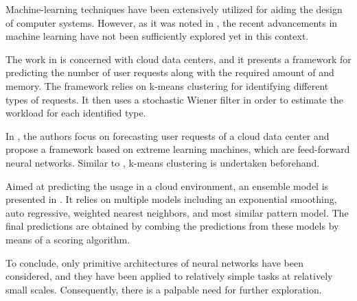 Machine-learning techniques have been extensively utilized for aiding the design
of computer systems. However, as it was noted in , the recent
advancements in machine learning have not been sufficiently explored yet in this
context.

The work in \cite{dabbagh2015} is concerned with cloud data centers, and it
presents a framework for predicting the number of user requests along with the
required amount of  and memory. The framework relies on k-means
clustering for identifying different types of requests. It then uses a
stochastic Wiener filter in order to estimate the workload for each identified
type.

In \cite{ismaeel2015}, the authors focus on forecasting user requests of a cloud
data center and propose a framework based on extreme learning machines, which
are feed-forward neural networks. Similar to \cite{dabbagh2015}, k-means
clustering is undertaken beforehand.

Aimed at predicting the  usage in a cloud environment, an ensemble model
is presented in \cite{cao2014}. It relies on multiple models including an
exponential smoothing, auto regressive, weighted nearest neighbors, and most
similar pattern model. The final predictions are obtained by combing the
predictions from these models by means of a scoring algorithm.

To conclude, only primitive architectures of neural networks have been
considered, and they have been applied to relatively simple tasks at relatively
small scales. Consequently, there is a palpable need for further exploration.
